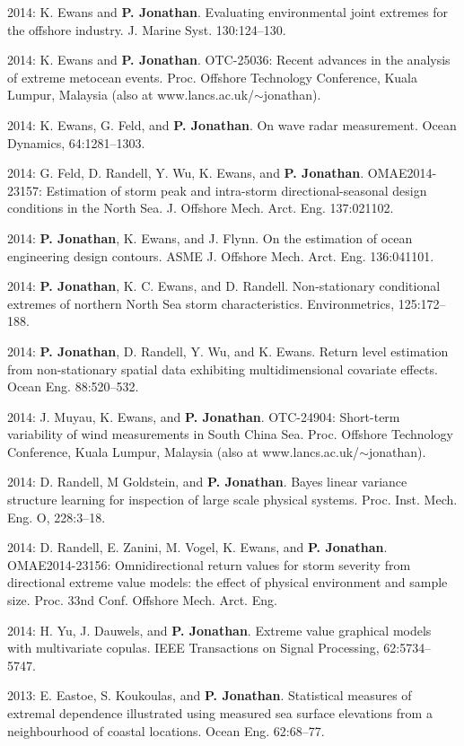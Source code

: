 \documentclass[11pt,a4paper]{moderncv}
\begin{document}
2014: K. Ewans and \textbf{P. Jonathan}. Evaluating environmental joint extremes for the offshore industry. J. Marine Syst. 130:124--130.

2014: K. Ewans and \textbf{P. Jonathan}. OTC-25036: Recent advances in the analysis of extreme metocean events. Proc. Offshore Technology Conference, Kuala Lumpur, Malaysia (also at www.lancs.ac.uk/$\sim$jonathan). 

2014: K. Ewans, G. Feld, and \textbf{P. Jonathan}. On wave radar measurement. Ocean Dynamics, 64:1281--1303. 

2014: G. Feld, D. Randell, Y. Wu, K. Ewans, and \textbf{P. Jonathan}. OMAE2014-23157: Estimation of storm peak and intra-storm directional-seasonal design conditions in the North Sea. J. Offshore Mech. Arct. Eng. 137:021102.

2014: \textbf{P. Jonathan}, K. Ewans, and J. Flynn. On the estimation of ocean engineering design contours. ASME J. Offshore Mech. Arct. Eng. 136:041101.

2014: \textbf{P. Jonathan}, K. C. Ewans, and D. Randell. Non-stationary conditional extremes of northern North Sea storm characteristics. Environmetrics, 125:172--188.

2014: \textbf{P. Jonathan}, D. Randell, Y. Wu, and K. Ewans. Return level estimation from non-stationary spatial data exhibiting multidimensional covariate effects. Ocean Eng. 88:520--532.

2014: J. Muyau, K. Ewans, and \textbf{P. Jonathan}. OTC-24904: Short-term variability of wind measurements in South China Sea. Proc. Offshore Technology Conference, Kuala Lumpur, Malaysia (also at www.lancs.ac.uk/$\sim$jonathan).

2014: D. Randell, M Goldstein, and \textbf{P. Jonathan}. Bayes linear variance structure learning for inspection of large scale physical systems. Proc. Inst. Mech. Eng. O, 228:3--18.

2014: D. Randell, E. Zanini, M. Vogel, K. Ewans, and \textbf{P. Jonathan}. OMAE2014-23156: Omnidirectional return values for storm severity from directional extreme value models: the effect of physical environment and sample size. Proc. 33nd Conf. Offshore Mech. Arct. Eng.

2014: H. Yu, J. Dauwels, and \textbf{P. Jonathan}. Extreme value graphical models with multivariate copulas. IEEE Transactions on Signal Processing, 62:5734--5747.

2013: E. Eastoe, S. Koukoulas, and \textbf{P. Jonathan}. Statistical measures of extremal dependence illustrated using measured sea surface elevations from a neighbourhood of coastal locations. Ocean Eng. 62:68--77.
\end{document}
